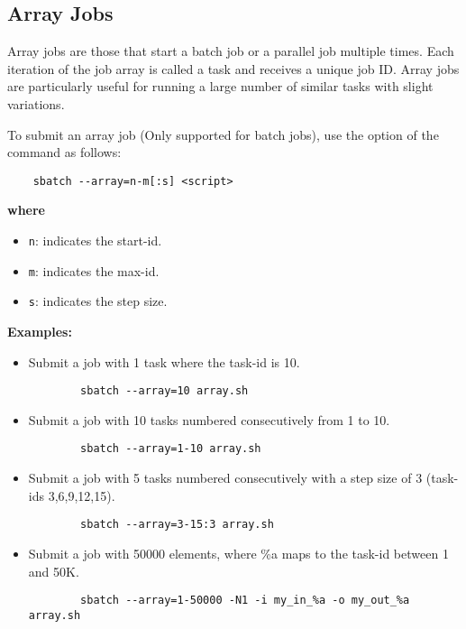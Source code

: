 \subsection{Array Jobs}
\label{sect:array-jobs}

Array jobs are those that start a batch job or a parallel job multiple times.
Each iteration of the job array is called a task and receives a unique job ID.
Array jobs are particularly useful for running a large number of similar tasks with slight variations.

To submit an array job (Only supported for batch jobs),
use the  option of the  command as follows:

\begin{verbatim}
	sbatch --array=n-m[:s] <script>
\end{verbatim}

\textbf{where}
\begin{itemize}
	\item \texttt{n}: indicates the start-id.
	\item \texttt{m}: indicates the max-id.
	\item \texttt{s}: indicates the step size.
\end{itemize}

\textbf{Examples:}
\begin{itemize}
	\item Submit a job with 1 task where the task-id is 10.
	\begin{verbatim}
		sbatch --array=10 array.sh
	\end{verbatim}

	\item Submit a job with 10 tasks numbered consecutively from 1 to 10.
	\begin{verbatim}
		sbatch --array=1-10 array.sh
	\end{verbatim}

	\item Submit a job with 5 tasks numbered consecutively with a step size of 3 (task-ids 3,6,9,12,15).
	\begin{verbatim}
		sbatch --array=3-15:3 array.sh
	\end{verbatim}

	\item Submit a job with 50000 elements, where \%a maps to the task-id between 1 and 50K.
	\begin{verbatim}
		sbatch --array=1-50000 -N1 -i my_in_%a -o my_out_%a array.sh
	\end{verbatim}
\end{itemize}

